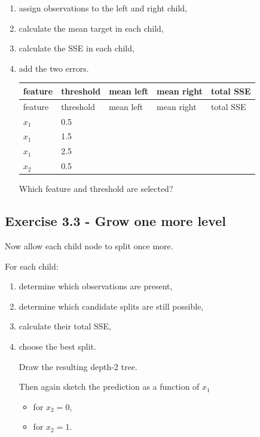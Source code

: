 \documentclass{course_sheet}
\begin{document}
\begin{enumerate}
\item
assign observations to the left and right child,

\item
calculate the mean target in each child,

\item
calculate the SSE in each child,

\item
add the two errors.

\begingroup
\small
\setlength{\tabcolsep}{4pt}
\begin{longtable}{l|l|l|l|l}
feature & threshold & mean left & mean right & total SSE \\
\hline
\endfirsthead
feature & threshold & mean left & mean right & total SSE \\
\hline
\endhead
$x_1$ & 0.5 &  &  &  \\[3pt]
$x_1$ & 1.5 &  &  &  \\[3pt]
$x_1$ & 2.5 &  &  &  \\[3pt]
$x_2$ & 0.5 &  &  &  \\[3pt]
\end{longtable}
\endgroup
Which feature and threshold are selected?

\end{enumerate}
\subsection*{Exercise 3.3 - Grow one more level}
Now allow each child node to split once more.

For each child:

\begin{enumerate}
\item
determine which observations are present,

\item
determine which candidate splits are still possible,

\item
calculate their total SSE,

\item
choose the best split.

Draw the resulting depth-2 tree.

Then again sketch the prediction as a function of $x_1$

\begin{itemize}
\item
for $x_2=0$,

\item
for $x_2=1$.

\end{itemize}
\end{enumerate}
\clearpage
\end{document}
